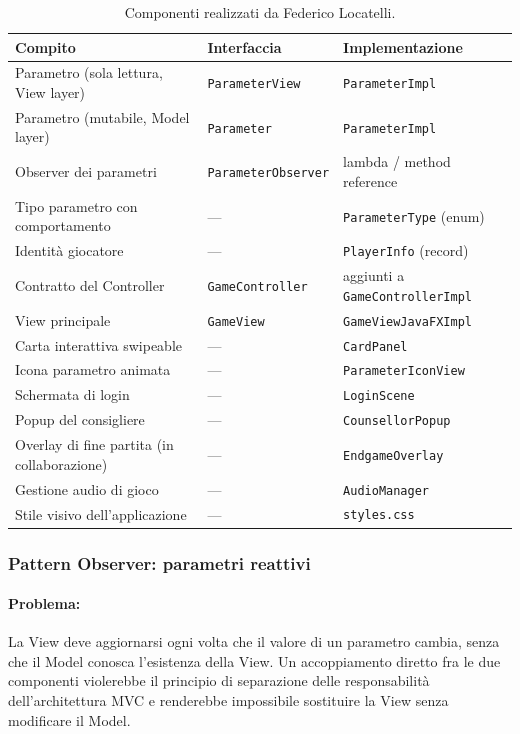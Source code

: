 \documentclass[11pt, a4paper, oneside]{report}
\begin{document}
\begin{table}[h]
\centering
\begin{tabular}{|l|l|l|}
\hline
\textbf{Compito} & \textbf{Interfaccia} & \textbf{Implementazione} \\ \hline
Parametro (sola lettura, View layer) & \texttt{ParameterView} & \texttt{ParameterImpl} \\ \hline
Parametro (mutabile, Model layer) & \texttt{Parameter} & \texttt{ParameterImpl} \\ \hline
Observer dei parametri & \texttt{ParameterObserver} & lambda / method reference \\ \hline
Tipo parametro con comportamento & --- & \texttt{ParameterType} (enum) \\ \hline
Identità giocatore & --- & \texttt{PlayerInfo} (record) \\ \hline
Contratto del Controller & \texttt{GameController} & aggiunti a \texttt{GameControllerImpl} \\ \hline
View principale & \texttt{GameView} & \texttt{GameViewJavaFXImpl} \\ \hline
Carta interattiva swipeable & --- & \texttt{CardPanel} \\ \hline
Icona parametro animata & --- & \texttt{ParameterIconView} \\ \hline
Schermata di login & --- & \texttt{LoginScene} \\ \hline
Popup del consigliere & --- & \texttt{CounsellorPopup} \\ \hline
Overlay di fine partita (in collaborazione) & --- & \texttt{EndgameOverlay} \\ \hline
Gestione audio di gioco & --- & \texttt{AudioManager} \\ \hline
Stile visivo dell'applicazione & --- & \texttt{styles.css} \\ \hline
\end{tabular}
\caption{Componenti realizzati da Federico Locatelli.}
\label{tab:locatelli-components}
\end{table}

\bigskip
\subsubsection{Pattern Observer: parametri reattivi}
\smallskip

\paragraph{Problema:}
La View deve aggiornarsi ogni volta che il valore di un parametro cambia,
senza che il Model conosca l'esistenza della View. Un accoppiamento diretto
fra le due componenti violerebbe il principio di separazione delle
responsabilità dell'architettura MVC e renderebbe impossibile sostituire
la View senza modificare il Model.
\end{document}
